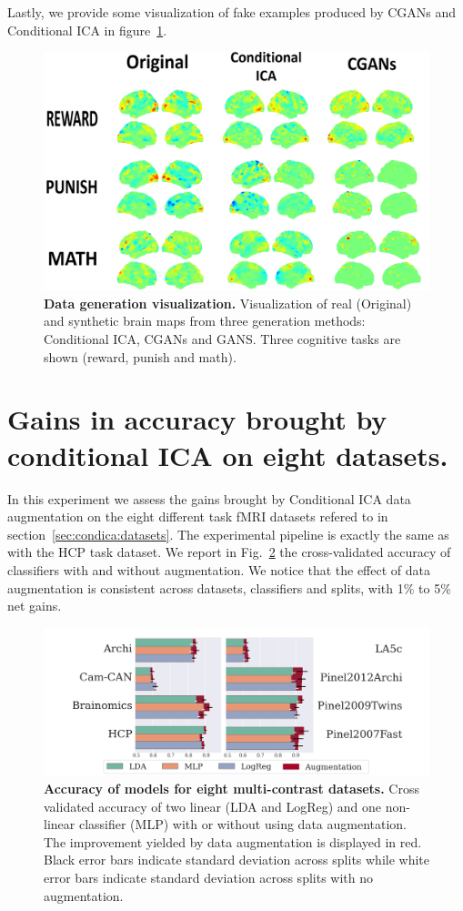 Lastly, we provide some visualization of fake examples produced by CGANs and Conditional ICA in figure~\ref{sec:visualization:fig}.
\begin{figure}
  \centerline{\includegraphics[width=0.8\linewidth]{figures/condica/fake_real_viz_v3_redim_improved2.png}}
  \caption{\textbf{Data generation visualization.} Visualization of real
    (Original) and synthetic brain maps from three generation methods:
    Conditional ICA, CGANs and GANS. Three cognitive tasks are shown (reward, punish and math).
  }
  \label{sec:visualization:fig}
\end{figure}






\section{Gains in accuracy brought by conditional ICA on eight datasets.}
In this experiment we assess the gains brought by Conditional ICA data
augmentation on the eight different task fMRI datasets refered to in section~\ref{sec:condica:datasets}. The experimental pipeline is exactly the same as with the HCP task dataset.
We report in Fig.~\ref{Fig4} the cross-validated accuracy of
classifiers with and without augmentation.
We notice that the effect of data augmentation is
consistent across datasets, classifiers and splits, with 1\% to 5\% net gains.
%
\begin{figure}
  \centering
  \includegraphics[width=\textwidth]{figures/condica/accuracy_all_datasets_v5.png}
\caption{\textbf{Accuracy of models for eight multi-contrast datasets.} Cross
  validated accuracy of two linear (LDA and LogReg) and one non-linear
  classifier (MLP) with or without using data augmentation.
  The improvement yielded by data augmentation is displayed in red.
  Black error bars indicate standard deviation across splits while white error bars indicate standard deviation across splits with no augmentation.}
\label{Fig4}
\end{figure}
%


